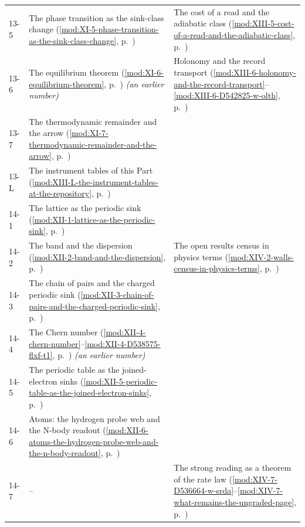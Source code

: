 {\begin{longtable}{p{11mm}p{70mm}p{60mm}}
13-5 & The phase transition as the sink-class change (\ref{mod:XI-5-phase-transition-as-the-sink-class-change}, p.~\pageref{mod:XI-5-phase-transition-as-the-sink-class-change}) & The cost of a read and the adiabatic class (\ref{mod:XIII-5-cost-of-a-read-and-the-adiabatic-class}, p.~\pageref{mod:XIII-5-cost-of-a-read-and-the-adiabatic-class}) \\
13-6 & The equilibrium theorem (\ref{mod:XI-6-equilibrium-theorem}, p.~\pageref{mod:XI-6-equilibrium-theorem}) \emph{(an earlier number)} & Holonomy and the record transport (\ref{mod:XIII-6-holonomy-and-the-record-transport}--\ref{mod:XIII-6-D542825-w-olth}, p.~\pageref{mod:XIII-6-holonomy-and-the-record-transport}) \\
13-7 & The thermodynamic remainder and the arrow (\ref{mod:XI-7-thermodynamic-remainder-and-the-arrow}, p.~\pageref{mod:XI-7-thermodynamic-remainder-and-the-arrow}) &  \\
13-L & The instrument tables of this Part (\ref{mod:XIII-L-the-instrument-tables-at-the-repository}, p.~\pageref{mod:XIII-L-the-instrument-tables-at-the-repository}) &  \\
14-1 & The lattice as the periodic sink (\ref{mod:XII-1-lattice-as-the-periodic-sink}, p.~\pageref{mod:XII-1-lattice-as-the-periodic-sink}) &  \\
14-2 & The band and the dispersion (\ref{mod:XII-2-band-and-the-dispersion}, p.~\pageref{mod:XII-2-band-and-the-dispersion}) & The open results census in physics terms (\ref{mod:XIV-2-walls-census-in-physics-terms}, p.~\pageref{mod:XIV-2-walls-census-in-physics-terms}) \\
14-3 & The chain of pairs and the charged periodic sink (\ref{mod:XII-3-chain-of-pairs-and-the-charged-periodic-sink}, p.~\pageref{mod:XII-3-chain-of-pairs-and-the-charged-periodic-sink}) &  \\
14-4 & The Chern number (\ref{mod:XII-4-chern-number}--\ref{mod:XII-4-D538575-flxf-t1}, p.~\pageref{mod:XII-4-chern-number}) \emph{(an earlier number)} &  \\
14-5 & The periodic table as the joined-electron sinks (\ref{mod:XII-5-periodic-table-as-the-joined-electron-sinks}, p.~\pageref{mod:XII-5-periodic-table-as-the-joined-electron-sinks}) &  \\
14-6 & Atoms: the hydrogen probe web and the N-body readout (\ref{mod:XII-6-atoms-the-hydrogen-probe-web-and-the-n-body-readout}, p.~\pageref{mod:XII-6-atoms-the-hydrogen-probe-web-and-the-n-body-readout}) &  \\
14-7 & -- & The strong reading as a theorem of the rate law (\ref{mod:XIV-7-D536664-w-srda}--\ref{mod:XIV-7-what-remains-the-ungraded-page}, p.~\pageref{mod:XIV-7-D536664-w-srda}) \\

\end{longtable}}
